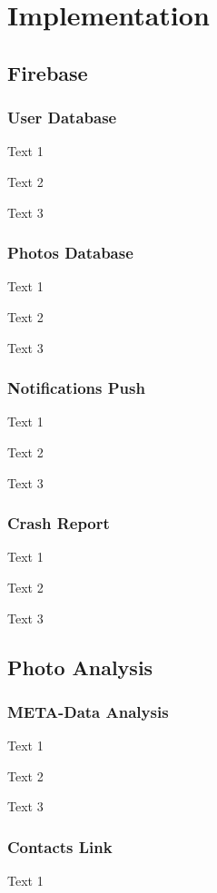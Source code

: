 \chapter{Implementation}
\label{chap:imp}

\section{Firebase}\label{sec:im1}


\subsection{User Database}\label{sec:im1.1}
Text 1

Text 2

Text 3

\subsection{Photos Database}\label{sec:im1.2}
Text 1

Text 2

Text 3

\subsection{Notifications Push}\label{sec:im1.3}
Text 1

Text 2

Text 3

\subsection{Crash Report}\label{sec:im1.4}
Text 1

Text 2

Text 3

\section{Photo Analysis}\label{sec:im2}


\subsection{META-Data Analysis}\label{sec:im2.1}
Text 1

Text 2

Text 3

\subsection{Contacts Link}\label{sec:im2.2}
Text 1

